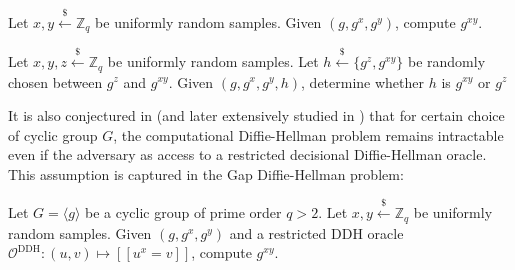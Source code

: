 \documentclass[runningheads]{llncs}
\newcommand{\leftsample}{\stackrel{\$}{\leftarrow}}
\newcommand{\llbrack}{[\![}
\newcommand{\rrbrack}{]\!]}
\begin{document}
\begin{definition}
    Let $x, y \leftsample \mathbb{Z}_q$ be uniformly random samples. Given $(g, g^x, g^y)$, compute $g^{xy}$.
\end{definition}
\begin{definition}
    Let $x, y, z \leftsample \mathbb{Z}_q$ be uniformly random samples. Let $h \leftsample \{g^z, g^{xy}\}$ be randomly chosen between $g^z$ and $g^{xy}$. Given $(g, g^x, g^y, h)$, determine whether $h$ is $g^{xy}$ or $g^z$
\end{definition}

It is also conjectured in \cite{DBLP:conf/ctrsa/AbdallaBR01} (and later extensively studied in \cite{DBLP:conf/pkc/OkamotoP01}) that for certain choice of cyclic group $G$, the computational Diffie-Hellman problem remains intractable even if the adversary as access to a restricted decisional Diffie-Hellman oracle. This assumption is captured in the Gap Diffie-Hellman problem:

\begin{definition}
    Let $G = \langle g \rangle$ be a cyclic group of prime order $q > 2$. Let $x, y \leftsample \mathbb{Z}_q$ be uniformly random samples. Given $(g, g^x, g^y)$ and a restricted DDH oracle $\mathcal{O}^\text{DDH}: (u, v) \mapsto \llbrack u^x = v \rrbrack$, compute $g^{xy}$.
\end{definition}
\end{document}
